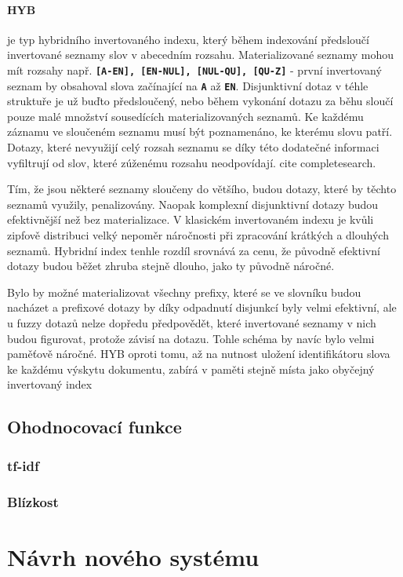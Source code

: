 \documentclass[12pt,letterpaper,oneside,openright]{book}
\newcommand{\bftt}[1]{\texttt{\textbf{#1}}}
\begin{document}
\subsubsection{HYB} je typ hybridního invertovaného indexu, který během
indexování předsloučí invertované seznamy slov v abecedním rozsahu.
Materializované seznamy mohou mít rozsahy např. \bftt{[A-EN], [EN-NUL],
[NUL-QU], [QU-Z]} - první invertovaný seznam by obsahoval slova
začínající na \bftt{A} až \bftt{EN}. Disjunktivní dotaz v téhle
struktuře je už buďto předsloučený, nebo během vykonání dotazu za běhu
sloučí pouze malé množství sousedících materializovaných seznamů. Ke
každému záznamu ve sloučeném seznamu musí být poznamenáno, ke kterému
slovu patří. Dotazy, které nevyužijí celý rozsah seznamu se díky této
dodatečné informaci vyfiltrují od slov, které zúženému rozsahu
neodpovídají. cite completesearch.

Tím, že jsou některé seznamy sloučeny do většího, budou dotazy, které by těchto
seznamů využily, penalizovány. Naopak komplexní disjunktivní dotazy budou
efektivnější než bez materializace. V klasickém invertovaném indexu je kvůli
zipfově distribuci velký nepoměr náročnosti při zpracování krátkých a dlouhých
seznamů. Hybridní index tenhle rozdíl srovnává za cenu, že původně efektivní
dotazy budou běžet zhruba stejně dlouho, jako ty původně náročné.

Bylo by možné materializovat všechny prefixy, které se ve slovníku budou
nacházet a prefixové dotazy by díky odpadnutí disjunkcí byly velmi efektivní,
ale u fuzzy dotazů nelze dopředu předpovědět, které invertované seznamy v nich
budou figurovat, protože závisí na dotazu. Tohle schéma by navíc bylo velmi
paměťově náročné. HYB oproti tomu, až na nutnost uložení identifikátoru slova
ke každému výskytu dokumentu, zabírá v paměti stejně místa jako obyčejný
invertovaný index


\section{Ohodnocovací funkce}
\subsection{tf-idf}
\subsection{Blízkost}



\chapter{Návrh nového systému}
\end{document}
